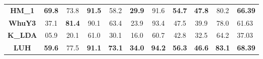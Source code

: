 \documentclass[final,3p,times,twocolumn,authoryear]{elsarticle}
\begin{document}
\begin{table*}[]
\begin{tabular}{c|ccccccccc|l}
\multicolumn{1}{c|}{\textbf{HM\_1}}  & {\color[HTML]{FE0000} \textbf{69.8}} & 73.8                                 & {\color[HTML]{FE0000} \textbf{91.5}} & 58.2                                 & {\color[HTML]{3531FF} \textbf{29.9}}                                 & 91.6                                 & {\color[HTML]{3531FF} \textbf{54.7}} & {\color[HTML]{FE0000} \textbf{47.8}} & 80.2                                 & {\color[HTML]{3531FF} \textbf{66.39}} \\
\multicolumn{1}{c|}{\textbf{WhuY3}}  & 37.1                                 & {\color[HTML]{FE0000} \textbf{81.4}} & 90.1                                 & 63.4                                 & 23.9                                 & 93.4                                 & 47.5                                 & 39.9                                 & 78.0                                 & 61.63                                 \\
\multicolumn{1}{c|}{\textbf{K\_LDA}} & 05.9                                 & 20.1                                 & 61.0                                 & 30.1                                 & 16.0                                 & 60.7                                 & 42.8                                 & 32.5                                 & 64.2                                 & 37.03                                 \\
\multicolumn{1}{c|}{\textbf{LUH}}    & {\color[HTML]{3531FF} \textbf{59.6}}                                 & 77.5                                 & {\color[HTML]{3531FF} \textbf{91.1}} & {\color[HTML]{3531FF} \textbf{73.1}} & {\color[HTML]{FE0000} \textbf{34.0}} & {\color[HTML]{FE0000} \textbf{94.2}} & {\color[HTML]{FE0000} \textbf{56.3}} & {\color[HTML]{3531FF} \textbf{46.6}} & {\color[HTML]{FE0000} \textbf{83.1}} & {\color[HTML]{FE0000} \textbf{68.39}} \\
\cline{1-11}
\end{tabular}
\end{table*} 
\end{document}
